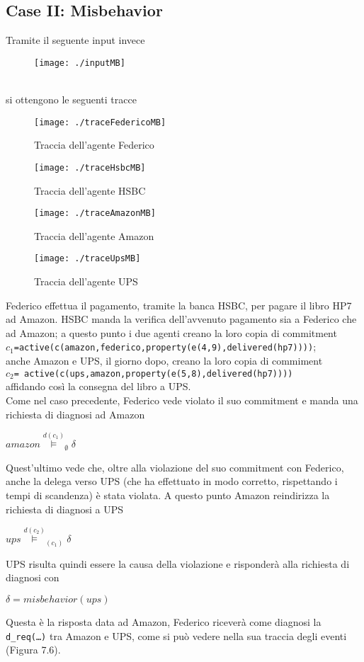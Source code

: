 \documentclass[a4paper,12pt]{report}
\begin{document}
\subsection{Case II: Misbehavior}
Tramite il seguente input invece
\begin{figure}[h]
    \texttt{[image: ./inputMB]}
\end{figure}
\\si ottengono le seguenti tracce
\begin{figure}[h]
    \texttt{[image: ./traceFedericoMB]}
    \caption{Traccia dell'agente Federico}
\end{figure}
\begin{figure}[h]
    \texttt{[image: ./traceHsbcMB]}
    \caption{Traccia dell'agente HSBC}
    \bigskip
    \texttt{[image: ./traceAmazonMB]}
    \caption{Traccia dell'agente Amazon}
    \bigskip
    \texttt{[image: ./traceUpsMB]}
    \caption{Traccia dell'agente UPS}
\end{figure}
\newpage
Federico effettua il pagamento, tramite la banca HSBC, per pagare il libro HP7 ad Amazon. HSBC manda la verifica dell'avvenuto pagamento sia a Federico che ad Amazon; a questo punto i due agenti creano la loro copia di commitment \\\texttt{$c_1$=active(c(amazon,federico,property(e(4,9),delivered(hp7))))};\\ anche Amazon e UPS, il giorno dopo, creano la loro copia di commiment\\ \texttt{$c_2$= active(c(ups,amazon,property(e(5,8),delivered(hp7))))}\\affidando così la consegna del libro a UPS.\\
Come nel caso precedente, Federico vede violato il suo commitment e manda una richiesta di diagnosi ad Amazon
\begin{center}
    \textit{$amazon\stackrel{d(c_1)}{\models}_{\emptyset} \delta$}
\end{center}
\newpage
Quest'ultimo vede che, oltre alla violazione del suo commitment con Federico, anche la delega verso UPS (che ha effettuato in modo corretto, rispettando i tempi di scandenza) è stata violata. A questo punto Amazon reindirizza la richiesta di diagnosi a UPS
\begin{center}
    \textit{$ups\stackrel{d(c_2)}{\models}_{(c_1)} \delta$}
\end{center}
UPS risulta quindi essere la causa della violazione e risponderà alla richiesta di diagnosi con
\begin{center}
    \textit{$\delta = misbehavior(ups)$}
\end{center}
Questa è la risposta data ad Amazon, Federico riceverà come diagnosi la \texttt{d\_req(\dots)} tra Amazon e UPS, come si può vedere nella sua traccia degli eventi (Figura 7.6).
\newpage
\end{document}
